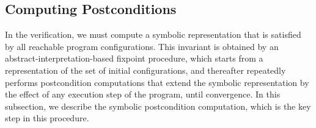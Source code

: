 \subsection{Computing Postconditions}
\label{subsect:postcond}
In the  verification, we must compute a symbolic representation
that is satisfied by all reachable program configurations.
This invariant is obtained by an abstract-interpretation-based
fixpoint procedure, which starts
from a representation of the set of initial configurations, and
thereafter repeatedly performs
postcondition computations that extend the
symbolic representation by the effect of any execution step of the program,
until convergence.
In this subsection, we describe the symbolic postcondition computation, which
is the key step in this procedure.

  


